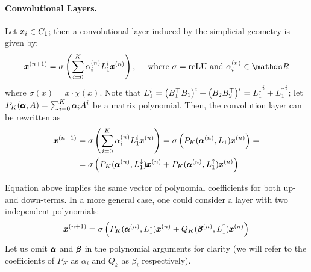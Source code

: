 \documentclass{mynotes}
\begin{document}
\paragraph{ Convolutional Layers. }

Let \( \pmb{x}_i \in C_1 \); then a convolutional layer induced by the simplicial geometry is given by:
\begin{equation*}
      \b x^{(n+1)} = \sigma \left( \sum_{i=0}^K \alpha_i^{(n)} L_1^i \b x^{(n)} \right), \quad \text{ where } \sigma=\mathrm{reLU} \text{ and } \alpha_i^{(n)} \in \ds R
\end{equation*}
where \(\sigma ( x ) = x \cdot \chi(x) \). Note that \( L_1^i = \left( B_1^\top B_1 \right)^i + \left( B_2 B_2^\top \right)^i = {L_{1}^{\downarrow}}^i + {L_{1}^{\uparrow}}^i \); let \( P_K( \pmb{\alpha}, A ) = \sum_{i=0}^K \alpha_i A^i \) be a matrix polynomial. Then, the convolution layer can be rewritten as
\begin{equation}
      \begin{aligned}
            \pmb{x}^{(n+1)} & = \sigma \left( \sum_{i=0}^K \alpha_i^{(n)} L_1^i \pmb{x}^{(n)} \right) = \sigma \left( P_K( \pmb{\alpha}^{(n)}, L_1) \pmb{x}^{(n)} \right) = \\
            & = \sigma \left( P_K( \pmb{\alpha}^{(n)}, L_{1}^{\downarrow}) \pmb{x}^{(n)} + P_K( \pmb{\alpha}^{(n)}, L_{1}^{\uparrow}) \pmb{x}^{(n)}  \right) 
      \end{aligned}
\end{equation}
\begin{comment}
\begin{remark} 
      Given the classical definition, the layer produces the output vector \( \b x_{n+1} \) as an element of the Krylov\todo{why do we need it? who knows} subspaces spanned by the input \( \b x_n \) baring the activation function:
      \begin{equation*}
            \b x_n = \sigma \left( \b y_n \right), \qquad \b y_n \in \mc K_K (L_1, \b x_n)
      \end{equation*}
\end{remark}
\end{comment}
Equation above implies the same vector of polynomial coefficients for both up- and down-terms. In a more general case, one could consider a layer with two independent polynomials:
\begin{equation}
      \pmb{x}^{(n+1)} = \sigma \left( P_K( \pmb{\alpha}^{(n)}, L_{1}^{\downarrow}) \pmb{x}^{(n)} + Q_K( \pmb{\beta}^{(n)}, L_{1}^{\uparrow}) \pmb{x}^{(n)}  \right) 
\end{equation}
Let us omit \( \pmb{\alpha} \) and \( \pmb{\beta} \) in the polynomial arguments for clarity (we will refer to the coefficients of \( P_K \) as \( \alpha_i \) and \( Q_k \) as \( \beta_i \) respectively).
\end{document}
